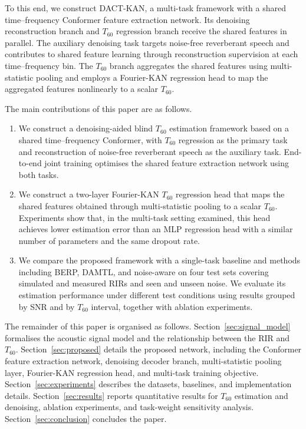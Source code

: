 \documentclass[a4paper,fleqn]{cas-sc}
\begin{document}


To this end, we construct DACT-KAN, a multi-task framework with a shared time--frequency Conformer feature extraction network. Its denoising reconstruction branch and $T_{60}$ regression branch receive the shared features in parallel. The auxiliary denoising task targets noise-free reverberant speech and contributes to shared feature learning through reconstruction supervision at each time--frequency bin. The $T_{60}$ branch aggregates the shared features using multi-statistic pooling and employs a Fourier-KAN regression head to map the aggregated features nonlinearly to a scalar $T_{60}$.



The main contributions of this paper are as follows.



\begin{enumerate}
\item We construct a denoising-aided blind $T_{60}$ estimation framework based on a shared time--frequency Conformer, with $T_{60}$ regression as the primary task and reconstruction of noise-free reverberant speech as the auxiliary task. End-to-end joint training optimises the shared feature extraction network using both tasks.
\item We construct a two-layer Fourier-KAN $T_{60}$ regression head that maps the shared features obtained through multi-statistic pooling to a scalar $T_{60}$. Experiments show that, in the multi-task setting examined, this head achieves lower estimation error than an MLP regression head with a similar number of parameters and the same dropout rate.
\item We compare the proposed framework with a single-task baseline and methods including BERP, DAMTL, and noise-aware on four test sets covering simulated and measured RIRs and seen and unseen noise. We evaluate its estimation performance under different test conditions using results grouped by SNR and by $T_{60}$ interval, together with ablation experiments.
\end{enumerate}



The remainder of this paper is organised as follows. Section~\ref{sec:signal_model} formalises the acoustic signal model and the relationship between the RIR and $T_{60}$. Section~\ref{sec:proposed} details the proposed network, including the Conformer feature extraction network, denoising decoder branch, multi-statistic pooling layer, Fourier-KAN regression head, and multi-task training objective. Section~\ref{sec:experiments} describes the datasets, baselines, and implementation details. Section~\ref{sec:results} reports quantitative results for $T_{60}$ estimation and denoising, ablation experiments, and task-weight sensitivity analysis. Section~\ref{sec:conclusion} concludes the paper.
\end{document}
